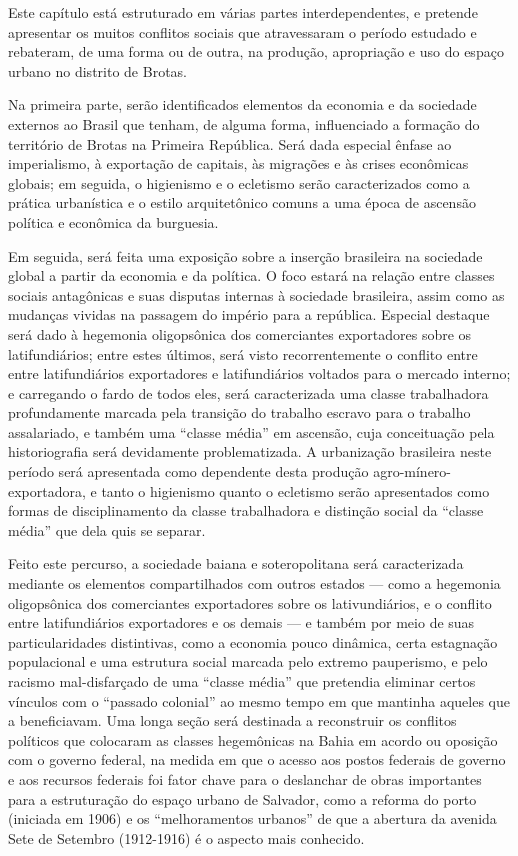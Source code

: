 
Este capítulo está estruturado em várias partes interdependentes, e pretende apresentar os muitos conflitos sociais que atravessaram o período estudado e rebateram, de uma forma ou de outra, na produção, apropriação e uso do espaço urbano no distrito de Brotas.

Na primeira parte, serão identificados elementos da economia e da sociedade externos ao Brasil que tenham, de alguma forma, influenciado a formação do território de Brotas na Primeira República. Será dada especial ênfase ao imperialismo, à exportação de capitais, às migrações e às crises econômicas globais; em seguida, o higienismo e o ecletismo serão caracterizados como a prática urbanística e o estilo arquitetônico comuns a uma época de ascensão política e econômica da burguesia. 

Em seguida, será feita uma exposição sobre a inserção brasileira na sociedade global a partir da economia e da política. O foco estará na relação entre classes sociais antagônicas e suas disputas internas à sociedade brasileira, assim como as mudanças vividas na passagem do império para a república. Especial destaque será dado à hegemonia oligopsônica dos comerciantes exportadores sobre os latifundiários; entre estes últimos, será visto recorrentemente o conflito entre entre latifundiários exportadores e latifundiários voltados para o mercado interno; e carregando o fardo de todos eles, será caracterizada uma classe trabalhadora profundamente marcada pela transição do trabalho escravo para o trabalho assalariado, e também uma ``classe média'' em ascensão, cuja conceituação pela historiografia será devidamente problematizada. A urbanização brasileira neste período será apresentada como dependente desta produção agro-mínero-exportadora, e tanto o higienismo quanto o ecletismo serão apresentados como formas de disciplinamento da classe trabalhadora e distinção social da ``classe média'' que dela quis se separar. 

Feito este percurso, a sociedade baiana e soteropolitana será caracterizada mediante os elementos compartilhados com outros estados --- como a hegemonia oligopsônica dos comerciantes exportadores sobre os lativundiários, e o conflito entre latifundiários exportadores e os demais --- e também por meio de suas particularidades distintivas, como a economia pouco dinâmica, certa estagnação populacional e uma estrutura social marcada pelo extremo pauperismo, e pelo racismo mal-disfarçado de uma ``classe média'' que pretendia eliminar certos vínculos com o ``passado colonial'' ao mesmo tempo em que mantinha aqueles que a beneficiavam. Uma longa seção será destinada a reconstruir os conflitos políticos que colocaram as classes hegemônicas na Bahia em acordo ou oposição com o governo federal, na medida em que o acesso aos postos federais de governo e aos recursos federais foi fator chave para o deslanchar de obras importantes para a estruturação do espaço urbano de Salvador, como a reforma do porto (iniciada em 1906) e os ``melhoramentos urbanos'' de que a abertura da avenida Sete de Setembro (1912-1916) é o aspecto mais conhecido.

